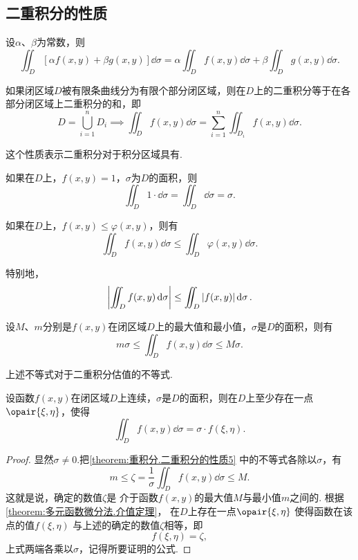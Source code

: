 \subsection{二重积分的性质}
\begin{property}\label{theorem:重积分.二重积分的性质1}
设\(\alpha\)、\(\beta\)为常数，则\[
\iint_D [\alpha f(x,y)+\beta g(x,y)] \dd{\sigma}
=\alpha \iint_D f(x,y) \dd{\sigma}
+\beta \iint_D g(x,y) \dd{\sigma}.
\]
\end{property}

\begin{property}\label{theorem:重积分.二重积分的性质2}
如果闭区域\(D\)被有限条曲线分为有限个部分闭区域，则在\(D\)上的二重积分等于在各部分闭区域上二重积分的和，即\[
D = \bigcup_{i=1}^n D_i
\implies
\iint_D f(x,y) \dd{\sigma}
= \sum\limits_{i=1}^n \iint_{D_i} f(x,y) \dd{\sigma}.
\]
\end{property}
这个性质表示二重积分对于积分区域具有.

\begin{property}\label{theorem:重积分.二重积分的性质3}
如果在\(D\)上，\(f(x,y)=1\)，\(\sigma\)为\(D\)的面积，则\[
\iint_D 1\cdot\dd{\sigma}
=\iint_D \dd{\sigma}
=\sigma.
\]
\end{property}

\begin{property}\label{theorem:重积分.二重积分的性质4}
如果在\(D\)上，\(f(x,y) \leq \varphi(x,y)\)，则有\[
\iint_D f(x,y) \dd{\sigma} \leq \iint_D \varphi(x,y) \dd{\sigma}.
\]

特别地，\[
\abs{\iint_D f(x,y) \dd{\sigma}} \leq \iint_D \abs{f(x,y)} \dd{\sigma}.
\]
\end{property}

\begin{property}\label{theorem:重积分.二重积分的性质5}
设\(M\)、\(m\)分别是\(f(x,y)\)在闭区域\(D\)上的最大值和最小值，\(\sigma\)是\(D\)的面积，则有\[
m\sigma \leq \iint_D f(x,y) \dd{\sigma} \leq M\sigma.
\]
\end{property}
上述不等式对于二重积分估值的不等式.

\begin{property}[二重积分的中值定理]\label{theorem:重积分.二重积分的中值定理}
设函数\(f(x,y)\)在闭区域\(D\)上连续，\(\sigma\)是\(D\)的面积，则在\(D\)上至少存在一点\(\opair{\xi,\eta}\)，使得\[
\iint_D f(x,y) \dd{\sigma} = \sigma \cdot f(\xi,\eta).
\]
\begin{proof}
显然\(\sigma\neq0\).把\cref{theorem:重积分.二重积分的性质5} 中的不等式各除以\(\sigma\)，有\[
m
\leq
\zeta = \frac{1}{\sigma} \iint_D f(x,y) \dd{\sigma}
\leq
M.
\]
这就是说，确定的数值\(\zeta\)是%
介于函数\(f(x,y)\)的最大值\(M\)与最小值\(m\)之间的.
根据\cref{theorem:多元函数微分法.介值定理}，
在\(D\)上存在一点\(\opair{\xi,\eta}\)%
使得函数在该点的值\(f(\xi,\eta)\)%
与上述的确定的数值\(\zeta\)相等，即\[
f(\xi,\eta) = \zeta,
\]上式两端各乘以\(\sigma\)，记得所要证明的公式.
\end{proof}
\end{property}

